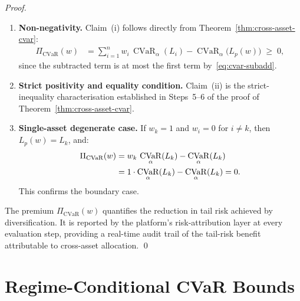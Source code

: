 \documentclass[12pt,openany]{book}
\newcommand{\bfw}{\mathbf{w}}
\DeclareMathOperator{\CVaR}{CVaR}
\numberwithin{equation}{chapter}
\theoremstyle{plain}
\theoremstyle{definition}
\theoremstyle{remark}
\def\bfw{w}%
\begin{document}
\begin{proof}
\begin{enumerate}[label=\textbf{Step \arabic*.}, leftmargin=*,
                  widest=Step 3., itemsep=1ex]

  \item \textbf{Non-negativity.}
        Claim~(i) follows directly from
        Theorem~\ref{thm:cross-asset-cvar}:
        \begin{align}
          \Pi_{\mathrm{CVaR}}(\bfw)
          &= \sum_{i=1}^n w_i\,\CVaR_\alpha(L_i)
             - \CVaR_\alpha\!\bigl(L_p(\bfw)\bigr)
          \;\geq\; 0,
        \end{align}
        since the subtracted term is at most the first term
        by~\eqref{eq:cvar-subadd}.

  \item \textbf{Strict positivity and equality condition.}
        Claim~(ii) is the strict-inequality characterisation
        established in Steps~5--6 of the proof of
        Theorem~\ref{thm:cross-asset-cvar}.

  \item \textbf{Single-asset degenerate case.}
        If $w_k = 1$ and $w_i = 0$ for $i \neq k$, then
        $L_p(\bfw) = L_k$, and:
        \begin{align}
          \Pi_{\mathrm{CVaR}}(\bfw)
          &= w_k\,\CVaR_\alpha(L_k)
             - \CVaR_\alpha(L_k)
          \notag\\
          &= 1 \cdot \CVaR_\alpha(L_k)
             - \CVaR_\alpha(L_k)
          = 0.
        \end{align}
        This confirms the boundary case.

\end{enumerate}

\noindent The premium $\Pi_{\mathrm{CVaR}}(\bfw)$ quantifies the
reduction in tail risk achieved by diversification.  It is
reported by the platform's risk-attribution layer at every
evaluation step, providing a real-time audit trail of the
tail-risk benefit attributable to cross-asset allocation.
\qed
\end{proof}

\section{Regime-Conditional CVaR Bounds}
\end{document}
